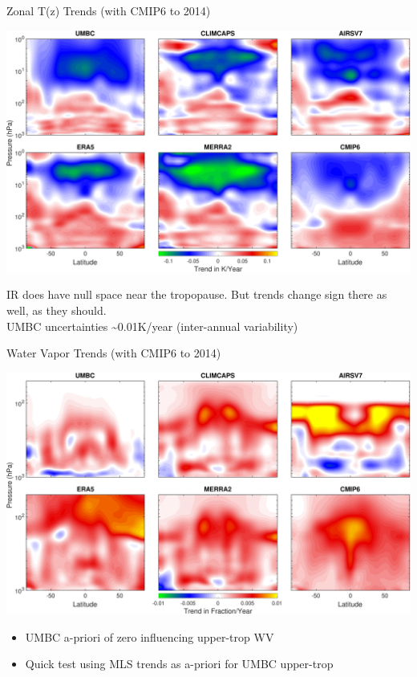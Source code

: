 \documentclass[10pt,t]{beamer}
\begin{document}
\begin{frame}{Zonal T(z) Trends (with CMIP6 to 2014)}
\vspace{-0.15in}
\begin{center}
\includegraphics[width=\linewidth]{SunClimate2022/zonal_trates_1to1000mbar_cmip6_newcaxis.pdf}
\end{center}

\footnotesize
IR does have null space near the tropopause.  But trends change sign there as well, as they should.\\
\vspace{0.1in}
UMBC uncertainties \textasciitilde{}0.01K/year (inter-annual variability)
\end{frame}

\begin{frame}{Water Vapor Trends (with CMIP6 to 2014)}
\vspace{-0.15in}
\begin{center}
\includegraphics[width=\linewidth]{SunClimate2022/zonal_wvrates_50to1000mbar_cmip6.pdf}
\end{center}

\small
\begin{itemize}
\item UMBC a-priori of zero influencing upper-trop WV
\item Quick test using MLS trends as a-priori for UMBC upper-trop
\end{itemize}
\end{frame}
\end{document}
